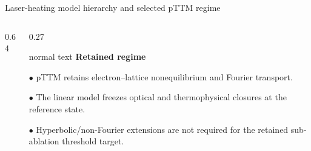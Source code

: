 \documentclass[aspectratio=169,10pt]{beamer}
\begin{document}
\begin{frame}[t]{Laser-heating model hierarchy and selected pTTM regime}
  \hypertarget{supp:physics-model-hierarchy}{}
  \vspace{-0.18cm}\hfill
  \hspace{0.10cm}\GVBackupIndexButton
  \vspace{0.02cm}
  \begin{columns}[T,totalwidth=0.95\textwidth]
    \begin{column}{0.64\textwidth}
      \centering
    \end{column}
    \begin{column}{0.27\textwidth}
      \begin{beamercolorbox}[wd=\linewidth,sep=0.48em]{normal text}
        \small\textbf{\color{GVTeal}Retained regime}\par
        \vspace{0.08cm}\scriptsize
        \(\bullet\) pTTM retains electron--lattice nonequilibrium and Fourier transport.\par
        \vspace{0.16cm}
        \(\bullet\) The linear model freezes optical and thermophysical closures at the reference state.\par
        \vspace{0.16cm}
        \(\bullet\) Hyperbolic/non-Fourier extensions are not required for the retained sub-ablation threshold target.
      \end{beamercolorbox}
    \end{column}
  \end{columns}
\end{frame}
\end{document}
